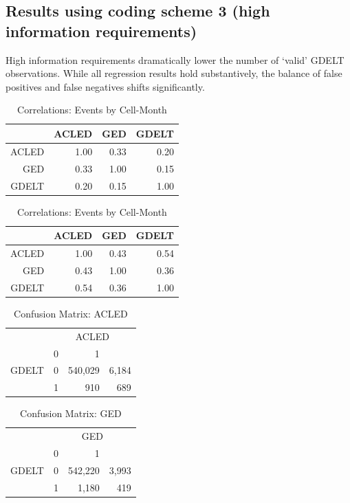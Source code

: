 \documentclass[hidelinks]{article}
\begin{document}
\newpage
\subsection*{Results using coding scheme 3 (high information requirements)}
High information requirements dramatically lower the number of `valid' GDELT observations. While all regression results hold substantively, the balance of false positives and false negatives shifts significantly.
\begin{table}[ht]
\centering
\begin{tabular}{rrrr}
  \hline
 & ACLED & GED & GDELT \\ 
  \hline
ACLED & 1.00 & 0.33 & 0.20 \\ 
  GED & 0.33 & 1.00 & 0.15 \\ 
GDELT & 0.20 & 0.15 & 1.00 \\ 
   \hline
\end{tabular}
\caption{Correlations: Events by Cell-Month} 
\end{table}

\begin{table}[ht]
\centering
\begin{tabular}{rrrr}
  \hline
 & ACLED & GED & GDELT \\ 
  \hline
ACLED & 1.00 & 0.43 & 0.54 \\ 
  GED & 0.43 & 1.00 & 0.36 \\ 
GDELT & 0.54 & 0.36 & 1.00 \\ 
   \hline
\end{tabular}
\caption{Correlations: Events by Cell-Month} 
\end{table}

\begin{table}[ht]
\centering
\begin{tabular}{rrrr}
  \hline
 &  \multicolumn{3}{c}{ACLED}\\
 & 0 & 1 \\ 
  \hline
 GDELT & 0 & 540,029 & 6,184 \\ 
&  1 & 910 & 689 \\ 
   \hline
\end{tabular}
\caption{Confusion Matrix: ACLED} 
\end{table}

\begin{table}[ht]
\centering
\begin{tabular}{rrrr}
  \hline
   &  \multicolumn{3}{c}{GED}\\
 & 0 & 1 \\ 
  \hline
GDELT & 0 & 542,220 & 3,993 \\ 
&  1 & 1,180 & 419 \\ 
   \hline
\end{tabular}
\caption{Confusion Matrix: GED} 
\end{table}
\end{document}
